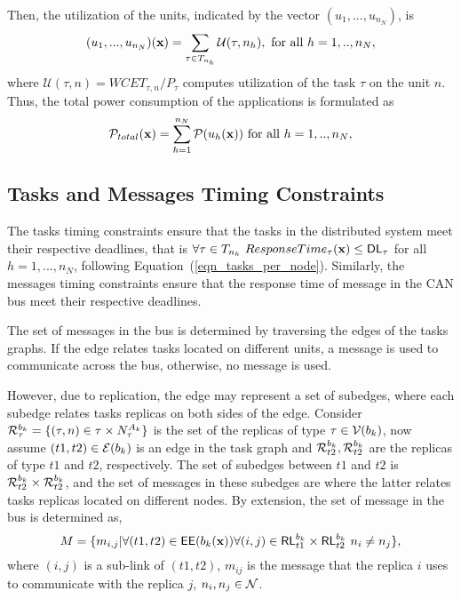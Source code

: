 Then, the utilization of the units, indicated by the vector $(u_1,...,u_{n_N})$, is 
\[
	(u_1,...,u_{n_N})(\x)=\sum_{\tau\in \ssb{T}[n_h]}{\mathcal{U}(\tau,n_h), \mbox{ for all } h=1,..,n_{N}},
\] where $\mathcal{U}(\tau,n)=WCET_{\tau,n}/P_\tau$ computes utilization of the task $\tau$ on the unit $n$. Thus, the total power consumption of the applications is formulated as
\begin{align}
\label{eqn_total_power}
\mathcal{P}_{total}(\textbf{x})  = \sum_{h=1}^{n_N}{\mathcal{P}(u_h(\textbf{x}))} \mbox{ for all } h=1,..,n_{N},  
\end{align}

\subsection{Tasks  and Messages Timing Constraints}
The tasks timing constraints ensure that the tasks in the distributed system meet their respective deadlines, that is 
$\forall \tau\in \ssb{T}[n_h] \ ResponseTime_\tau(\x)\leq \DL_\tau$ for all $h=1,...,n_N$, following Equation~(\ref{eqn_tasks_per_node}). Similarly, the messages timing constraints ensure that the response time of message in the CAN bus meet their respective deadlines. 

The set of messages in the bus is determined by traversing the edges of the tasks graphs. If the edge relates tasks located on different units, a message is used to communicate across the bus, otherwise, no message is used.

However, due to replication, the edge may represent a set of subedges, where each subedge relates tasks replicas on both sides of the edge. Consider $\sss{\mathcal{R}}[k][\tau][b]=\{(\tau,n)\in\tau\times\sss{N}[k][\tau]\}$ is the set of the replicas of type $\tau\in\mathcal{V}(b_{k})$, now assume $(t1,t2)\in\mathcal{E}(b_{k})$ is an edge in the task graph and  $\sss{\mathcal{R}}[k][t2][b], \sss{\mathcal{R}}[k][t2][b]$ are the replicas of type $t1$ and $t2$, respectively. The set of subedges between $t1$ and $t2$ is  $\sss{\mathcal{R}}[k][t2][b]\times\sss{\mathcal{R}}[k][t2][b]$, and the set of messages in these subedges are where the latter relates tasks replicas located on different nodes. By extension, the set of message in the bus is determined as,
\begin{equation}
\label{eqn_tasks_nodes}
M=\{m_{i,j} | \forall (t1,t2)\in \EE(\atx)\forall (i,j)\in\sss{\RL}[k][t1][b]\times\sss{\RL}[k][t2][b]\ n_i\neq n_j\},
\end{equation}
where $(i,j)$ is a sub-link of $(t1,t2)$, $m_{ij}$ is the message that the replica $i$ uses to communicate with the replica $j$, $n_i,n_j\in \mathcal{N}$.  

